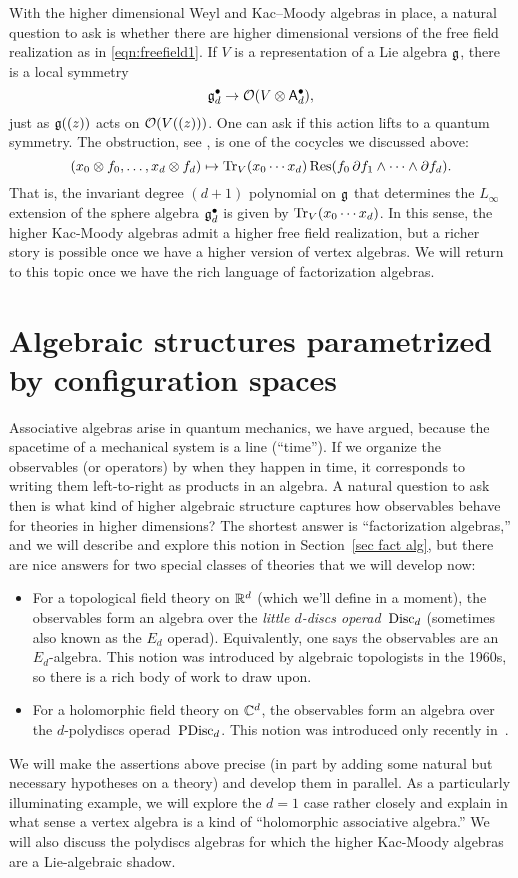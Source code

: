 \documentclass[11pt]{amsart}
\begin{document}
With the higher dimensional Weyl and Kac--Moody algebras in place, a natural question to ask is whether there are higher dimensional versions of the free field realization as in \eqref{eqn:freefield1}. 
If $V$ is a representation of a Lie algebra $\mathfrak g$,
there is a local symmetry 
\[
\mathfrak g^\bullet_d \to \mathcal O(V \otimes \mathsf A^{\bullet}_d),
\]
just as $\mathfrak g((z))$ acts on $\mathcal O(V((z)))$. 
One can ask if this action lifts to a quantum symmetry.
The obstruction, see \cite{GWkm}, is one of the cocycles we discussed above:
\[
(x_0 \otimes f_0, \ldots, x_{d} \otimes f_{d}) \mapsto {\rm Tr}_V( x_0 \cdots x_{d}) \,{\rm Res}(f_0 \, \partial f_1 \wedge \cdots \wedge \partial f_{d}).
\]
That is, the invariant degree $(d+1)$ polynomial on $\mathfrak g$ that determines the $L_\infty$ extension of the sphere algebra $\mathfrak g_d^\bullet$ is given by ${\rm Tr}_V (x_0 \cdots x_{d})$.
In this sense, the higher Kac-Moody algebras admit a higher free field realization,
but a richer story is possible once we have a higher version of vertex algebras.
We will return to this topic once we have the rich language of factorization algebras.

\section{Algebraic structures parametrized by configuration spaces}
\label{sec: config}

Associative algebras arise in quantum mechanics, we have argued, because the spacetime of a mechanical system is a line (``time'').
If we organize the observables (or operators) by when they happen in time,
it corresponds to writing them left-to-right as products in an algebra.
A natural question to ask then is what kind of higher algebraic structure captures how observables behave for theories in higher dimensions?
The shortest answer is ``factorization algebras,'' and we will describe and explore this notion in Section~\ref{sec fact alg},
but there are nice answers for two special classes of theories that we will develop now:
\begin{itemize}
\item For a topological field theory on $\mathbb R^d$ (which we'll define in a moment),
the observables form an algebra over the {\em little $d$-discs operad}~${\rm Disc}_d$ (sometimes also known as the $E_d$ operad). 
Equivalently, one says the observables are an $E_d$-algebra. 
This notion was introduced by algebraic topologists in the 1960s, 
so there is a rich body of work to draw upon.
\item For a holomorphic field theory on $\mathbb C^d$,
the observables form an algebra over the $d$-polydiscs operad~${\rm PDisc}_d$.
This notion was introduced only recently in~\cite{CG1}.
\end{itemize}
We will make the assertions above precise (in part by adding some natural but necessary hypotheses on a theory)
and develop them in parallel.
As a particularly illuminating example, we will explore the $d=1$ case rather closely and explain in what sense a vertex algebra is a kind of ``holomorphic associative algebra.''
We will also discuss the polydiscs algebras for which the higher Kac-Moody algebras are a Lie-algebraic shadow.
\end{document}
